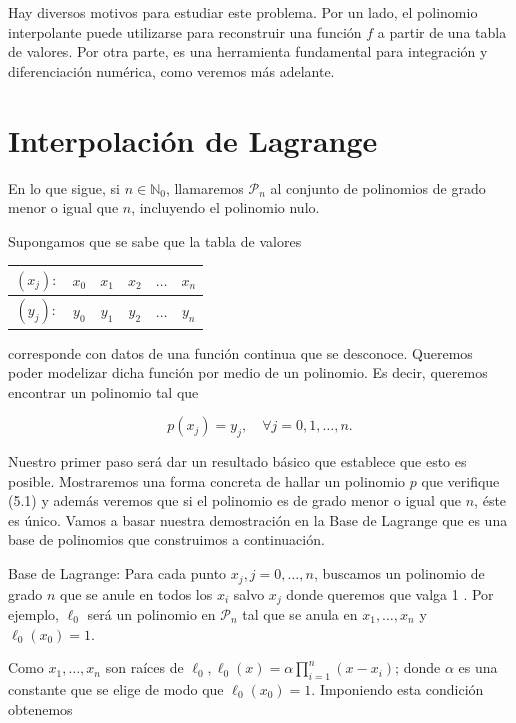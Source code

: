 \documentclass[10pt]{book}
\begin{document}
Hay diversos motivos para estudiar este problema. Por un lado, el polinomio interpolante puede utilizarse para reconstruir una función $f$ a partir de una tabla de valores. Por otra parte, es una herramienta fundamental para integración y diferenciación numérica, como veremos más adelante.

\section{Interpolación de Lagrange}
En lo que sigue, si $n \in \mathbb{N}_{0}$, llamaremos $\mathcal{P}_{n}$ al conjunto de polinomios de grado menor o igual que $n$, incluyendo el polinomio nulo.

Supongamos que se sabe que la tabla de valores

\begin{center}
\begin{tabular}{|c||c|c|c|c|c|}
\hline
$\left(x_{j}\right):$ & $x_{0}$ & $x_{1}$ & $x_{2}$ & $\ldots$ & $x_{n}$ \\
\hline
$\left(y_{j}\right):$ & $y_{0}$ & $y_{1}$ & $y_{2}$ & $\ldots$ & $y_{n}$ \\
\hline
\end{tabular}
\end{center}

corresponde con datos de una función continua que se desconoce. Queremos poder modelizar dicha función por medio de un polinomio. Es decir, queremos encontrar un polinomio tal que


\begin{equation*}
p\left(x_{j}\right)=y_{j}, \quad \forall j=0,1, \ldots, n . \tag{5.1}
\end{equation*}


Nuestro primer paso será dar un resultado básico que establece que esto es posible. Mostraremos una forma concreta de hallar un polinomio $p$ que verifique (5.1) y además veremos que si el polinomio es de grado menor o igual que $n$, éste es único. Vamos a basar nuestra demostración en la Base de Lagrange que es una base de polinomios que construimos a continuación.

Base de Lagrange: Para cada punto $x_{j}, j=0, \ldots, n$, buscamos un polinomio de grado $n$ que se anule en todos los $x_{i}$ salvo $x_{j}$ donde queremos que valga 1 . Por ejemplo, $\ell_{0}$ será un polinomio en $\mathcal{P}_{n}$ tal que se anula en $x_{1}, \ldots, x_{n}$ y $\ell_{0}\left(x_{0}\right)=1$.

Como $x_{1}, \ldots, x_{n}$ son raíces de $\ell_{0}, \ell_{0}(x)=\alpha \prod_{i=1}^{n}\left(x-x_{i}\right)$; donde $\alpha$ es una constante que se elige de modo que $\ell_{0}\left(x_{0}\right)=1$. Imponiendo esta condición obtenemos
\end{document}
